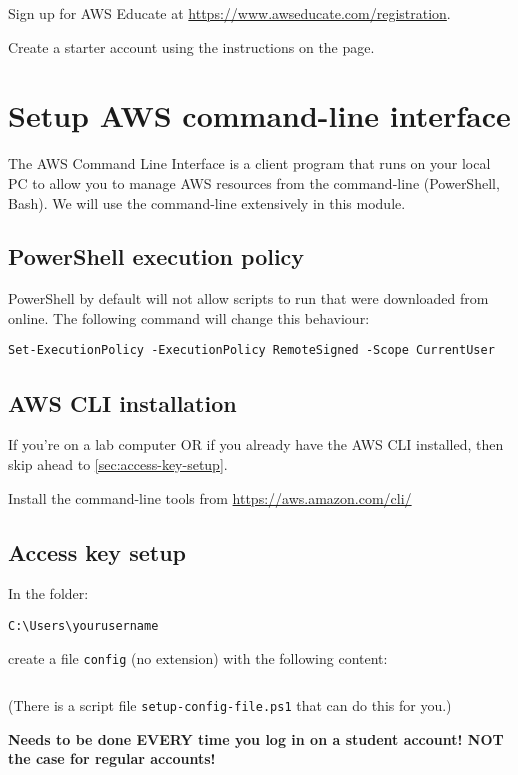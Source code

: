 \documentclass{pgnotes}
\begin{document}
Sign up for AWS Educate at
\url{https://www.awseducate.com/registration}.

Create a starter account using the instructions on the page.


\section{Setup AWS command-line interface}

The AWS Command Line Interface is a client program that runs on your local PC to allow you to manage AWS resources from the command-line (PowerShell, Bash).
We will use the command-line extensively in this module.

\subsection{PowerShell execution policy}

PowerShell by default will not allow scripts to run that were downloaded from online.
The following command will change this behaviour: 
\begin{verbatim}
Set-ExecutionPolicy -ExecutionPolicy RemoteSigned -Scope CurrentUser
\end{verbatim}

\subsection{AWS CLI installation}

If you're on a lab computer OR if you already have the AWS CLI installed, then skip ahead to \autoref{sec:access-key-setup}.

Install the command-line tools from \url{https://aws.amazon.com/cli/}

\subsection{Access key setup}
\label{sec:access-key-setup}

In the folder:
\begin{verbatim}
C:\Users\yourusername
\end{verbatim}
create a file \texttt{config} (no extension) with the following content:
\inputminted{text}{config}
(There is a script file \texttt{setup-config-file.ps1} that can do this for you.)

\textbf{Needs to be done EVERY time you log in on a student account! NOT the case for regular accounts!}
\end{document}
